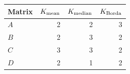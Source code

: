 \begin{tabular}{lrrr}
\toprule
Matrix & $K_{\rm mean}$ & $K_{\rm median}$ & $K_{\rm Borda}$\\
\midrule
$A$ & 2 & 2 & 3 \\
$B$ & 2 & 3 & 2 \\
$C$ & 3 & 3 & 2 \\
$D$ & 2 & 1 & 2 \\
\bottomrule
\end{tabular}